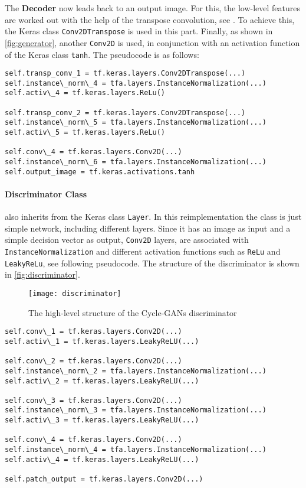 \documentclass[fleqn,10pt]{SelfArx} %
\begin{document}
The \textbf{Decoder} now leads back to an output image. For this, the low-level features are worked out with the help of the transpose convolution, see \cite{Introduction-to-Cycle-GANs}. To achieve this, the Keras class \texttt{Conv2DTranspose} is used in this part. Finally, as shown in \autoref{fig:generator}, another \texttt{Conv2D} is used, in conjunction with an activation function of the Keras class \texttt{tanh}. The pseudocode is as follows:  
\begin{lstlisting}
self.transp_conv_1 = tf.keras.layers.Conv2DTranspose(...)
self.instance\_norm\_4 = tfa.layers.InstanceNormalization(...)
self.activ\_4 = tf.keras.layers.ReLu()

self.transp_conv_2 = tf.keras.layers.Conv2DTranspose(...)
self.instance\_norm\_5 = tfa.layers.InstanceNormalization(...)
self.activ\_5 = tf.keras.layers.ReLu()

self.conv\_4 = tf.keras.layers.Conv2D(...)
self.instance\_norm\_6 = tfa.layers.InstanceNormalization(...)
self.output_image = tf.keras.activations.tanh
\end{lstlisting}

\paragraph{Discriminator Class} also inherits from the Keras class \texttt{Layer}. In this reimplementation the class is just simple network, including different layers. Since it has an image as input and a simple decision vector as output, \texttt{Conv2D} layers, are associated with \texttt{InstanceNormalization} and different activation functions such as \texttt{ReLu} and \texttt{LeakyReLu}, see following pseudocode. The structure of the discriminator is shown in \autoref{fig:discriminator}. \cite{Introduction-to-Cycle-GANs}

\begin{figure*}[htb] 
	\centering 
	\texttt{[image: discriminator]}
	\caption{The high-level structure of the Cycle-\ac{GAN}s discriminator \cite{Introduction-to-Cycle-GANs}}
	\label{fig:discriminator}
\end{figure*}

\begin{lstlisting}
self.conv\_1 = tf.keras.layers.Conv2D(...)                                        
self.activ\_1 = tf.keras.layers.LeakyReLU(...)

self.conv\_2 = tf.keras.layers.Conv2D(...)
self.instance\_norm\_2 = tfa.layers.InstanceNormalization(...)                                     
self.activ\_2 = tf.keras.layers.LeakyReLU(...)  

self.conv\_3 = tf.keras.layers.Conv2D(...)
self.instance\_norm\_3 = tfa.layers.InstanceNormalization(...)                                     
self.activ\_3 = tf.keras.layers.LeakyReLU(...)    

self.conv\_4 = tf.keras.layers.Conv2D(...)
self.instance\_norm\_4 = tfa.layers.InstanceNormalization(...)                                     
self.activ\_4 = tf.keras.layers.LeakyReLU(...)              

self.patch_output = tf.keras.layers.Conv2D(...)
\end{lstlisting}
\end{document}
